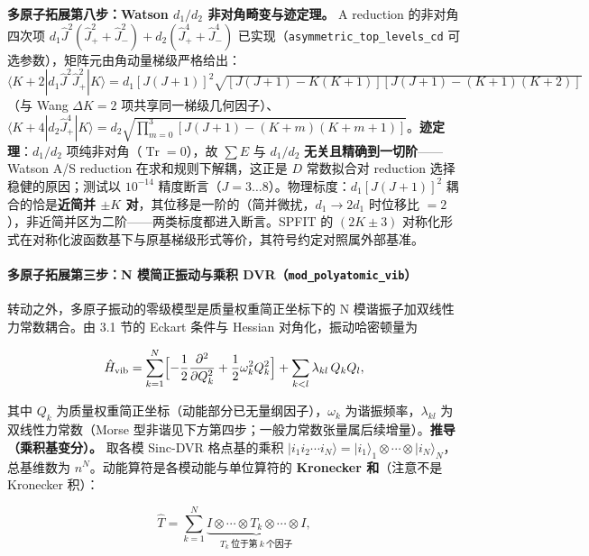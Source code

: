 \documentclass[
]{ctexbook}
\begin{document}
\textbf{多原子拓展第八步：Watson \(d_1/d_2\) 非对角畸变与迹定理。} A
reduction 的非对角四次项
\(d_1\hat{J}^2(\hat{J}_+^2+\hat{J}_-^2)+d_2(\hat{J}_+^4+\hat{J}_-^4)\)
已实现（\texttt{asymmetric\_top\_levels\_cd}
可选参数），矩阵元由角动量梯级严格给出：\(\langle K{+}2|d_1\hat{J}^2\hat{J}_+^2|K\rangle=d_1[J(J+1)]^2\sqrt{[J(J+1)-K(K{+}1)][J(J+1)-(K{+}1)(K{+}2)]}\)（与
Wang \(\Delta K=2\)
项共享同一梯级几何因子）、\(\langle K{+}4|d_2\hat{J}_+^4|K\rangle=d_2\sqrt{\prod_{m=0}^{3}[J(J+1)-(K{+}m)(K{+}m+1)]}\)。\textbf{迹定理}：\(d_1/d_2\)
项纯非对角（\(\operatorname{Tr}=0\)），故 \(\sum E\) 与 \(d_1/d_2\)
\textbf{无关且精确到一切阶}------Watson A/S reduction
在求和规则下解耦，这正是 \(D\) 常数拟合对 reduction
选择稳健的原因；测试以 \(10^{-14}\)
精度断言（\(J=3\ldots8\)）。物理标度：\(d_1[J(J+1)]^2\)
耦合的恰是\textbf{近简并 \(\pm K\)
对}，其位移是一阶的（简并微扰，\(d_1\to2d_1\) 时位移比
\(=2\)），非近简并区为二阶------两类标度都进入断言。SPFIT 的
\((2K\pm3)\)
对称化形式在对称化波函数基下与原基梯级形式等价，其符号约定对照属外部基准。

\hypertarget{ux591aux539fux5b50ux62d3ux5c55ux7b2cux4e09ux6b65n-ux6a21ux7b80ux6b63ux632fux52a8ux4e0eux4e58ux79ef-dvrmod_polyatomic_vib}{%
\paragraph{\texorpdfstring{多原子拓展第三步：N 模简正振动与乘积
DVR（\texttt{mod\_polyatomic\_vib}）}{多原子拓展第三步：N 模简正振动与乘积 DVR（mod\_polyatomic\_vib）}}\label{ux591aux539fux5b50ux62d3ux5c55ux7b2cux4e09ux6b65n-ux6a21ux7b80ux6b63ux632fux52a8ux4e0eux4e58ux79ef-dvrmod_polyatomic_vib}}

转动之外，多原子振动的零级模型是质量权重简正坐标下的 N
模谐振子加双线性力常数耦合。由 3.1 节的 Eckart 条件与 Hessian
对角化，振动哈密顿量为

\[\hat{H}_{\mathrm{vib}}=\sum_{k=1}^{N}\Bigl[-\frac{1}{2}\frac{\partial^{2}}{\partial Q_k^{2}}+\frac{1}{2}\omega_k^{2}Q_k^{2}\Bigr]
+\sum_{k<l}\lambda_{kl}\,Q_kQ_l,\]

其中 \(Q_k\) 为质量权重简正坐标（动能部分已无量纲因子），\(\omega_k\)
为谐振频率，\(\lambda_{kl}\) 为双线性力常数（Morse
型非谐见下方第四步；一般力常数张量属后续增量）。\textbf{推导（乘积基变分）。}
取各模 Sinc-DVR 格点基的乘积
\(|i_1 i_2 \cdots i_N\rangle=|i_1\rangle_1\otimes\cdots\otimes|i_N\rangle_N\)，总基维数为
\(n^{N}\)。动能算符是各模动能与单位算符的 \textbf{Kronecker
和}（注意不是 Kronecker 积）：

\[\hat{T}=\sum_{k=1}^{N}\underbrace{I\otimes\cdots\otimes T_k\otimes\cdots\otimes I}_{T_k\ \text{位于第}\ k\ \text{个因子}},\]
\end{document}
